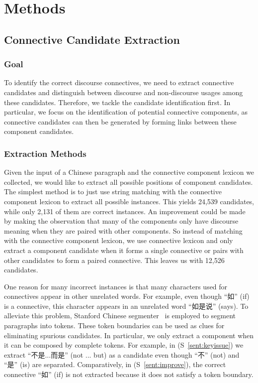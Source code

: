%
%
%
\chapter{Methods}
\label{c:method}

\section{Connective Candidate Extraction}

\subsection{Goal}

To identify the correct discourse connectives, we need to
extract connective candidates and distinguish between discourse
and non-discourse usages among these candidates. Therefore, we tackle the
candidate identification first. In particular, we focus on the identification
of potential connective components, as connective candidates can then be
generated by forming links between these component candidates.

\subsection{Extraction Methods}

Given the input of a Chinese paragraph and the connective component lexicon we collected,
we would like to extract all possible positions of component candidates.
The simplest method is to just use string matching with the connective
component lexicon to extract all possible instances. This yields
24,539 candidates, while only 2,131 of them are correct instances. An improvement
could be made by making the observation that many of the components only have
discourse meaning when they are paired with other components. So instead of matching
with the connective component lexicon, we use connective lexicon and only extract
a component candidate when it forms a single connective or pairs with
other candidates to form a paired connective. This leaves us with 12,526 candidates.

One reason for many incorrect instances is that many characters used for connectives
appear in other unrelated words. For example, even though ``如'' (if) is a connective,
this character appears in an unrelated word ``如是说'' (says). To alleviate this problem,
Stanford Chinese segmenter~\citep{chang2008optimizing} is employed to segment paragraphs
into tokens. These token boundaries can be used as clues for eliminating spurious candidates.
In particular, we only extract a component when it can be composed by complete tokens.
For example, in (S~\ref{sent:keyissue}) we extract ``不是...而是'' (not ... but) as a candidate
even though ``不'' (not) and ``是'' (is) are separated. Comparatively, in (S~\ref{sent:improve}),
the correct connective ``如'' (if) is not extracted because it does not satisfy a token boundary.

